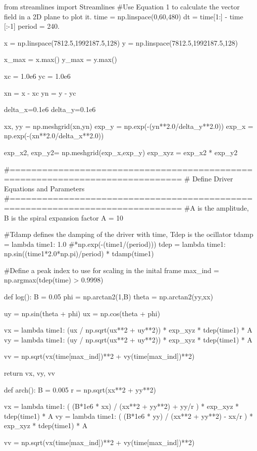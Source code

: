 \begin{pycode}[chapter4]
from streamlines import Streamlines
#Use Equation 1 to calculate the vector field in a 2D plane to plot it.
time = np.linspace(0,60,480)
dt = time[1:] - time [:-1]
period = 240.

x = np.linspace(7812.5,1992187.5,128)
y = np.linspace(7812.5,1992187.5,128)

x_max = x.max()
y_max = y.max()

xc = 1.0e6
yc = 1.0e6

xn = x - xc
yn = y - yc

delta_x=0.1e6
delta_y=0.1e6

xx, yy = np.meshgrid(xn,yn)
exp_y = np.exp(-(yn**2.0/delta_y**2.0))
exp_x = np.exp(-(xn**2.0/delta_x**2.0))

exp_x2, exp_y2= np.meshgrid(exp_x,exp_y)
exp_xyz = exp_x2 * exp_y2


#==============================================================================
# Define Driver Equations and Parameters
#==============================================================================
#A is the amplitude, B is the spiral expansion factor
A = 10

#Tdamp defines the damping of the driver with time, Tdep is the ocillator
tdamp = lambda time1: 1.0 #*np.exp(-(time1/(period)))
tdep = lambda time1: np.sin((time1*2.0*np.pi)/period) * tdamp(time1)

#Define a peak index to use for scaling in the inital frame
max_ind = np.argmax(tdep(time) > 0.9998)

def log():
	B = 0.05
	phi = np.arctan2(1,B)
	theta = np.arctan2(yy,xx)
	
	uy = np.sin(theta + phi)
	ux =  np.cos(theta + phi)
	
	vx = lambda time1: (ux / np.sqrt(ux**2 + uy**2)) * exp_xyz * tdep(time1) * A
	vy = lambda time1: (uy / np.sqrt(ux**2 + uy**2)) * exp_xyz * tdep(time1) * A
	
	vv = np.sqrt(vx(time[max_ind])**2 + vy(time[max_ind])**2)
	
	return vx, vy, vv

def arch():
	B = 0.005
	r = np.sqrt(xx**2 + yy**2)
	
	vx = lambda time1: ( (B*1e6 * xx) / (xx**2 + yy**2) + yy/r ) * exp_xyz * tdep(time1) * A
	vy = lambda time1: ( (B*1e6 * yy) / (xx**2 + yy**2) - xx/r ) * exp_xyz * tdep(time1) * A
	
	vv = np.sqrt(vx(time[max_ind])**2 + vy(time[max_ind])**2)
	

\end{pycode}
